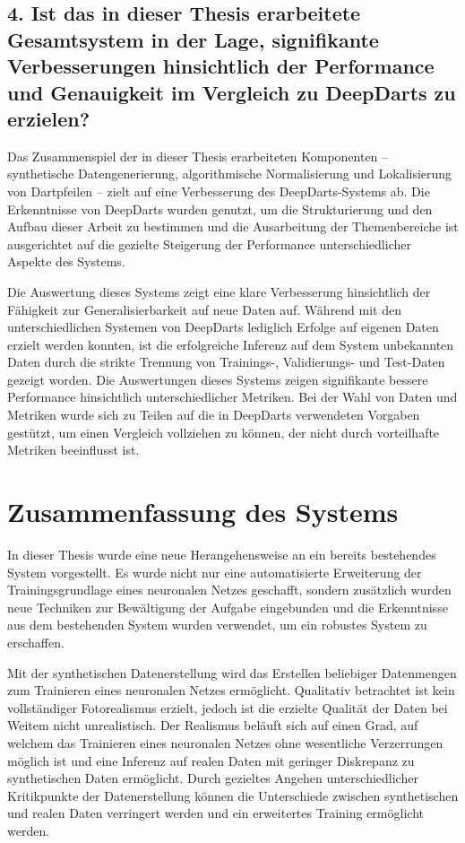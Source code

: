 \subsection*{4. Ist das in dieser Thesis erarbeitete Gesamtsystem in der Lage, signifikante Verbesserungen hinsichtlich der Performance und Genauigkeit im Vergleich zu DeepDarts zu erzielen?}

Das Zusammenspiel der in dieser Thesis erarbeiteten Komponenten -- synthetische Datengenerierung, algorithmische Normalisierung und Lokalisierung von Dartpfeilen -- zielt auf eine Verbesserung des DeepDarts-Systems ab. Die Erkenntnisse von DeepDarts wurden genutzt, um die Strukturierung und den Aufbau dieser Arbeit zu bestimmen und die Ausarbeitung der Themenbereiche ist ausgerichtet auf die gezielte Steigerung der Performance unterschiedlicher Aspekte des Systems.

Die Auswertung dieses Systems zeigt eine klare Verbesserung hinsichtlich der Fähigkeit zur Generalisierbarkeit auf neue Daten auf. Während mit den unterschiedlichen Systemen von DeepDarts lediglich Erfolge auf eigenen Daten erzielt werden konnten, ist die erfolgreiche Inferenz auf dem System unbekannten Daten durch die strikte Trennung von Trainings-, Validierungs- und Test-Daten gezeigt worden. Die Auswertungen dieses Systems zeigen signifikante bessere Performance hinsichtlich unterschiedlicher Metriken. Bei der Wahl von Daten und Metriken wurde sich zu Teilen auf die in DeepDarts verwendeten Vorgaben gestützt, um einen Vergleich vollziehen zu können, der nicht durch vorteilhafte Metriken beeinflusst ist.

\section{Zusammenfassung des Systems}

In dieser Thesis wurde eine neue Herangehensweise an ein bereits bestehendes System vorgestellt. Es wurde nicht nur eine automatisierte Erweiterung der Trainingsgrundlage eines neuronalen Netzes geschafft, sondern zusätzlich wurden neue Techniken zur Bewältigung der Aufgabe eingebunden und die Erkenntnisse aus dem bestehenden System wurden verwendet, um ein robustes System zu erschaffen.

Mit der synthetischen Datenerstellung wird das Erstellen beliebiger Datenmengen zum Trainieren eines neuronalen Netzes ermöglicht. Qualitativ betrachtet ist kein vollständiger Fotorealismus erzielt, jedoch ist die erzielte Qualität der Daten bei Weitem nicht unrealistisch. Der Realismus beläuft sich auf einen Grad, auf welchem das Trainieren eines neuronalen Netzes ohne wesentliche Verzerrungen möglich ist und eine Inferenz auf realen Daten mit geringer Diskrepanz zu synthetischen Daten ermöglicht. Durch gezieltes Angehen unterschiedlicher Kritikpunkte der Datenerstellung können die Unterschiede zwischen synthetischen und realen Daten verringert werden und ein erweitertes Training ermöglicht werden.

